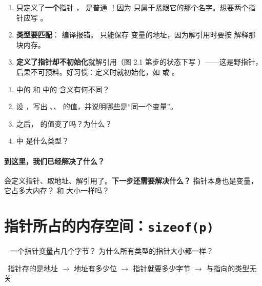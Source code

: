 \begin{warningbox}
\begin{enumerate}
  \item {} 只定义了\textbf{一个}指针 ， 是普通 ！因为 \cc{*} 只属于紧跟它的那个名字。想要两个指针应写 。
  \item \textbf{类型要匹配}： 编译报错。 只能保存  变量的地址，因为解引用时要按  解释那块内存。
  \item \textbf{定义了指针却不初始化}就解引用（图 2.1 第步的状态下写 ）——这是野指针，后果不可预料。好习惯：定义时就初始化，如  或 。
\end{enumerate}
\end{warningbox}

\begin{checkbox}
\begin{enumerate}[label=\arabic*.,itemsep=0pt]
  \item {} 中的 \cc{*} 和  中的 \cc{*} 含义有何不同？
  \item 设 ，写出 、、 的值，并说明哪些是“同一个变量”。
  \item {} 之后， 的值变了吗？为什么？
  \item {} 中  是什么类型？
\end{enumerate}
\end{checkbox}

\paragraph{到这里，我们已经解决了什么？} 会定义指针、取地址、解引用了。\textbf{下一步还需要解决什么？} 指针本身也是变量，它占多大内存？ 和  大小一样吗？

\section{\texorpdfstring{指针所占的内存空间：\texttt{sizeof(p)}}{指针所占的内存空间：sizeof(p)}}\label{sec:size}
\  一个指针变量占几个字节？ 为什么所有类型的指针大小都一样？\par
{}\ 指针存的是地址 $\to$ 地址有多少位 $\to$ 指针就要多少字节 $\to$ 与指向的类型无关

